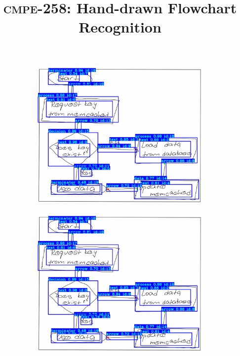 \documentclass[10pt]{article}
\begin{document}
\thispagestyle{empty}

\vspace{-2em}
\title{\huge \textsc{cmpe-258}: Hand-drawn Flowchart Recognition}
\date{}

\vspace{-2em}
\author{}

\maketitle

\vspace{-5em}

\begin{figure}[h]
\centering
\begin{subfigure}{0.30\columnwidth}
\includegraphics[width=\columnwidth]{sample.png}
\end{subfigure}
\begin{subfigure}{0.30\columnwidth}
\includegraphics[width=\columnwidth]{sample.png}

\end{subfigure}
\end{figure}
\end{document}
